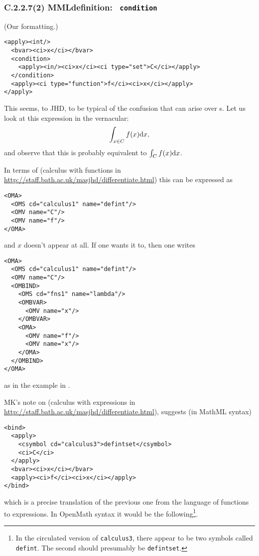 \documentclass{llncs}
\begin{document}
{\subsubsection{C.2.2.7(2) MMLdefinition: {\tt
condition}}\label{sec:defintcond}\label{C2272}
(Our formatting.)
\begin{lstlisting}[language=MathML2]
<apply><int/>
  <bvar><ci>x</ci></bvar>
  <condition>
    <apply><in/><ci>x</ci><ci type="set">C</ci></apply>
  </condition>
  <apply><ci type="function">f</ci><ci>x</ci></apply>
</apply>
\end{lstlisting}
This seems, to JHD, to be typical of the confusion that can arise over
{}s. Let us look at this expression in the vernacular: 
\begin{equation}\label{defintcond}
\int_{x\in C}f(x){\rm d} x,
\end{equation}
and observe that this is probably equivalent to $\int_{C}f(x){\rm d} x$.
\par
In terms of {} (calculus with functions in
\url{http://staff.bath.ac.uk/masjhd/differentiate.html})
this can be expressed as 
\begin{lstlisting}
<OMA>
  <OMS cd="calculus1" name="defint"/>
  <OMV name="C"/>
  <OMV name="f"/>
</OMA>
\end{lstlisting}
and $x$ doesn't appear at all. If one wants it to, then one writes
\begin{lstlisting}
<OMA>
  <OMS cd="calculus1" name="defint"/>
  <OMV name="C"/>
  <OMBIND>
    <OMS cd="fns1" name="lambda"/>
    <OMBVAR>
      <OMV name="x"/>
    </OMBVAR>
    <OMA>
      <OMV name="f"/>
      <OMV name="x"/>
    </OMA>
  </OMBIND>
</OMA>
\end{lstlisting}
as in the example in {}.
\par
MK's note \cite{Kohlhase2008} on {} (calculus with
expressions in \url{http://staff.bath.ac.uk/masjhd/differentiate.html}),
suggests (in MathML syntax)
\begin{lstlisting}[language=MathML2]
<bind>
  <apply>
    <csymbol cd="calculus3">defintset</csymbol>
    <ci>C</ci>
  </apply>
  <bvar><ci>x</ci></bvar>
  <apply><ci>f</ci><ci>x</ci></apply>
</bind>
\end{lstlisting}
which is a precise translation of the previous one from the language of
functions to expressions.
In OpenMath syntax it would be the following\footnote{In the circulated
version of {\tt calculus3}, there appear to be two symbols called {\tt
defint}. The second should presumably be {\tt defintset}.}.
}
\end{document}
